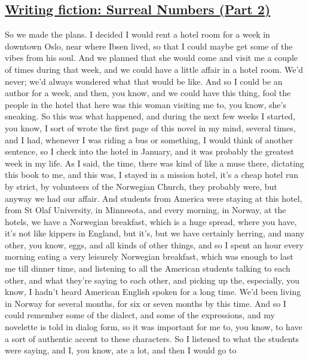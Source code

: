 \documentclass[]{article}
\begin{document}
\subsection{\texorpdfstring{\href{http://webofstories.com/play/17100}{Writing
fiction: Surreal Numbers (Part
2)}}{Writing fiction: Surreal Numbers (Part 2)}}\label{writing-fiction-surreal-numbers-part-2}

So we made the plans. I decided I would rent a hotel room for a week in
downtown Oslo, near where Ibsen lived, so that I could maybe get some of
the vibes from his soul. And we planned that she would come and visit me
a couple of times during that week, and we could have a little affair in
a hotel room. We'd never; we'd always wondered what that would be like.
And so I could be an author for a week, and then, you know, and we could
have this thing, fool the people in the hotel that here was this woman
visiting me to, you know, she's sneaking. So this was what happened, and
during the next few weeks I started, you know, I sort of wrote the first
page of this novel in my mind, several times, and I had, whenever I was
riding a bus or something, I would think of another sentence, so I check
into the hotel in January, and it was probably the greatest week in my
life. As I said, the time, there was kind of like a muse there,
dictating this book to me, and this was, I stayed in a mission hotel,
it's a cheap hotel run by strict, by volunteers of the Norwegian Church,
they probably were, but anyway we had our affair. And students from
America were staying at this hotel, from St Olaf University, in
Minnesota, and every morning, in Norway, at the hotels, we have a
Norwegian breakfast, which is a huge spread, where you have, it's not
like kippers in England, but it's, but we have certainly herring, and
many other, you know, eggs, and all kinds of other things, and so I
spent an hour every morning eating a very leisurely Norwegian breakfast,
which was enough to last me till dinner time, and listening to all the
American students talking to each other, and what they're saying to each
other, and picking up the, especially, you know, I hadn't heard American
English spoken for a long time. We'd been living in Norway for several
months, for six or seven months by this time. And so I could remember
some of the dialect, and some of the expressions, and my novelette is
told in dialog form, so it was important for me to, you know, to have a
sort of authentic accent to these characters. So I listened to what the
students were saying, and I, you know, ate a lot, and then I would go to
\end{document}
